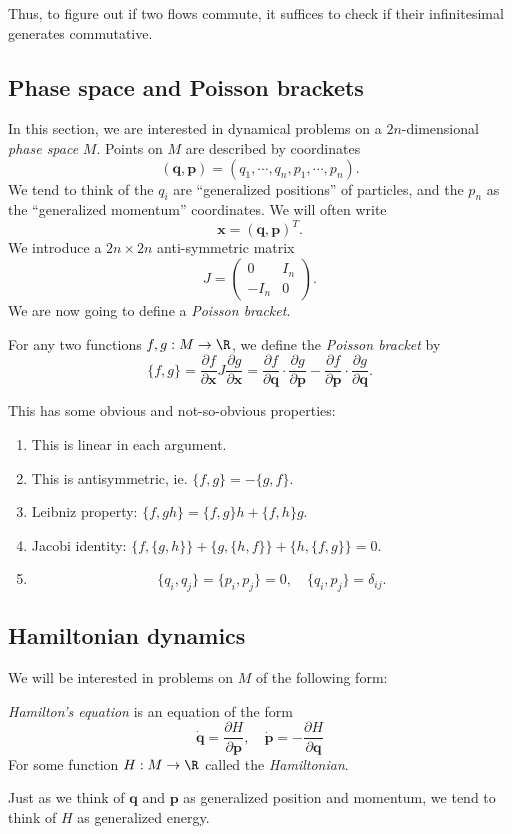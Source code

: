 \documentclass[a4paper]{article}
\begin{document}
Thus, to figure out if two flows commute, it suffices to check if their infinitesimal generates commutative.
\subsection{Phase space and Poisson brackets}
In this section, we are interested in dynamical problems on a $2n$-dimensional \emph{phase space} $M$. Points on $M$ are described by coordinates
\[
  (\mathbf{q}, \mathbf{p}) = (q_1, \cdots, q_n, p_1, \cdots, p_n).
\]
We tend to think of the $q_i$ are ``generalized positions'' of particles, and the $p_n$ as the ``generalized momentum'' coordinates. We will often write
\[
  \mathbf{x} = (\mathbf{q}, \mathbf{p})^T.
\]
We introduce a $2n \times 2n$ anti-symmetric matrix
\[
  J =
  \begin{pmatrix}
    0 & I_n\\
    -I_n & 0
  \end{pmatrix}.
\]
We are now going to define a \emph{Poisson bracket}.

\begin{defi}
  For any two functions $f, g: M \to \R$, we define the \emph{Poisson bracket} by
  \[
    \{f, g\} = \frac{\partial f}{\partial \mathbf{x}} J \frac{\partial g}{\partial \mathbf{x}} = \frac{\partial f}{\partial \mathbf{q}} \cdot \frac{\partial g}{\partial \mathbf{p}} - \frac{\partial f}{\partial \mathbf{p}} \cdot \frac{\partial g}{\partial \mathbf{q}}.
  \]
\end{defi}

This has some obvious and not-so-obvious properties: 
\begin{prop}\leavevmode
  \begin{enumerate}
    \item This is linear in each argument.
    \item This is antisymmetric, ie. $\{f, g\} = - \{g, f\}$.
    \item Leibniz property: $\{f, gh\} = \{f, g\}h + \{f, h\} g$.
    \item Jacobi identity: $\{f, \{g, h\}\} + \{g, \{h, f\}\} + \{h, \{f, g\}\} = 0$.
    \item
      \[
        \{q_i, q_j\} = \{p_i, p_j\} = 0,\quad \{q_i, p_j\} = \delta_{ij}.
      \]
  \end{enumerate}
\end{prop}

\subsection{Hamiltonian dynamics}
We will be interested in problems on $M$ of the following form:
\begin{defi}
  \emph{Hamilton's equation} is an equation of the form
  \[
    \dot{\mathbf{q}} = \frac{\partial H}{\partial \mathbf{p}},\quad \dot{\mathbf{p}} = -\frac{\partial H}{\partial \mathbf{q}}\tag{$*$}
  \]
  For some function $H: M \to \R$ called the \emph{Hamiltonian}.
\end{defi}
Just as we think of $\mathbf{q}$ and $\mathbf{p}$ as generalized position and momentum, we tend to think of $H$ as generalized energy.
\end{document}
